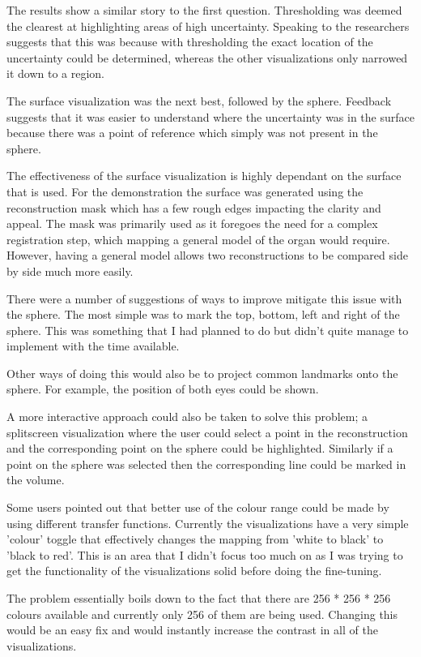 The results show a similar story to the first question. Thresholding was deemed the clearest at highlighting areas of high uncertainty. Speaking to the researchers suggests that this was because with thresholding the exact location of the uncertainty could be determined, whereas the other visualizations only narrowed it down to a region.

The surface visualization was the next best, followed by the sphere. Feedback suggests that it was easier to understand where the uncertainty was in the surface because there was a point of reference which simply was not present in the sphere.

The effectiveness of the surface visualization is highly dependant on the surface that is used. For the demonstration the surface was generated using the reconstruction mask which has a few rough edges impacting the clarity and appeal. The mask was primarily used as it foregoes the need for a complex registration step, which mapping a general model of the organ would require. However, having a general model allows two reconstructions to be compared side by side much more easily.

There were a number of suggestions of ways to improve mitigate this issue with the sphere. The most simple was to mark the top, bottom, left and right of the sphere. This was something that I had planned to do but didn't quite manage to implement with the time available.

Other ways of doing this would also be to project common landmarks onto the sphere. For example, the position of both eyes could be shown.

A more interactive approach could also be taken to solve this problem; a splitscreen visualization where the user could select a point in the reconstruction and the corresponding point on the sphere could be highlighted. Similarly if a point on the sphere was selected then the corresponding line could be marked in the volume.

Some users pointed out that better use of the colour range could be made by using different transfer functions. Currently the visualizations have a very simple 'colour' toggle that effectively changes the mapping from 'white to black' to 'black to red'. This is an area that I didn't focus too much on as I was trying to get the functionality of the visualizations solid before doing the fine-tuning.

The problem essentially boils down to the fact that there are 256 * 256 * 256 colours available and currently only 256 of them are being used. Changing this would be an easy fix and would instantly increase the contrast in all of the visualizations.

